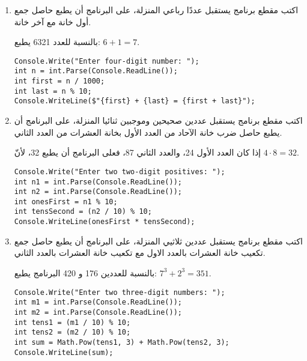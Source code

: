 \documentclass[12pt]{article}
\begin{document}
\begin{enumerate}[itemsep=2em]
\item
	اكتب مقطع برنامج يستقبل عددًا رباعي المنزلة، على البرنامج أن يطبع حاصل جمع أول خانة مع آخر خانة. \\
    \begin{boxExample}
        بالنسبة للعدد 6321 يطبع: $6 + 1 = 7$.
    \end{boxExample}

\ifwithsols
\begin{boxSolution}
\begin{english}
\begin{verbatim}
Console.Write("Enter four-digit number: ");
int n = int.Parse(Console.ReadLine());
int first = n / 1000;
int last = n % 10;
Console.WriteLine($"{first} + {last} = {first + last}");
\end{verbatim}
\end{english}
\end{boxSolution}
\fi

    \item
	اكتب مقطع برنامج يستقبل عددين صحيحين وموجبين ثنائيا المنزلة، على البرنامج أن يطبع حاصل ضرب خانة الآحاد من العدد الأول بخانة العشرات من العدد الثاني. \\
    \begin{boxExample}
        إذا كان العدد الأول 24، والعدد الثاني 87، فعلى البرنامج أن يطبع 32، لأنّ $4 \cdot 8 = 32$.
    \end{boxExample}

\ifwithsols
\begin{boxSolution}
\begin{english}
\begin{verbatim}
Console.Write("Enter two two-digit positives: ");
int n1 = int.Parse(Console.ReadLine());
int n2 = int.Parse(Console.ReadLine());
int onesFirst = n1 % 10;
int tensSecond = (n2 / 10) % 10;
Console.WriteLine(onesFirst * tensSecond);
\end{verbatim}
\end{english}
\end{boxSolution}
\clearpage
\fi

\item
	اكتب مقطع برنامج يستقبل عددين ثلاثيي المنزلة، على البرنامج أن يطبع حاصل جمع تكعيب خانة العشرات بالعدد الاول مع تكعيب خانة العشرات بالعدد الثاني. \\
    \begin{boxExample}
    بالنسبة للعددين 176 و 420 البرنامج يطبع: $7^3 + 2^3 = 351$.
    \end{boxExample}

\ifwithsols
\begin{boxSolution}
\begin{english}
\begin{verbatim}
Console.Write("Enter two three-digit numbers: ");
int m1 = int.Parse(Console.ReadLine());
int m2 = int.Parse(Console.ReadLine());
int tens1 = (m1 / 10) % 10;
int tens2 = (m2 / 10) % 10;
int sum = Math.Pow(tens1, 3) + Math.Pow(tens2, 3);
Console.WriteLine(sum);
\end{verbatim}
\end{english}
\end{boxSolution}
\fi


\end{enumerate}
\end{document}
